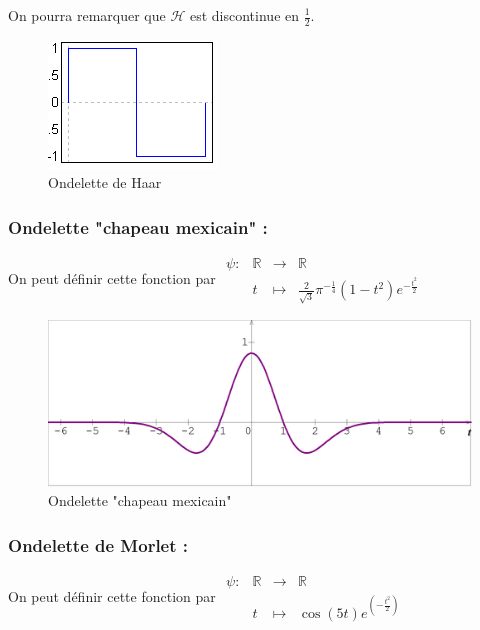 \documentclass{article}
\begin{document}
On pourra remarquer que $\mathcal{H}$ est discontinue en $\frac{1}{2}$.

\begin{figure}[!h]
\centering
\includegraphics[scale=1.1]{images/haar.png}
\caption{Ondelette de Haar}
\label{haar}
\end{figure}

\subsubsection{Ondelette "chapeau mexicain" :}

On peut définir cette fonction par $\begin{array}{lrcl}
\psi : & \mathbb{R} & \longrightarrow & \mathbb{R} \\
    & t & \longmapsto & \frac{2}{\sqrt{3}}\pi^{-\frac{1}{4}}(1-t^2)e^{-\frac{t^2}{2}} \end{array}$
    
\begin{figure}[!h]
\centering
\includegraphics[scale=0.2]{images/chapeau_mexicain.png}
\caption{Ondelette "chapeau mexicain"}
\label{chapmex}
\end{figure}
    
\subsubsection{Ondelette de Morlet :}

On peut définir cette fonction par $\begin{array}{lrcl}
\psi : & \mathbb{R} & \longrightarrow & \mathbb{R} \\
    & t & \longmapsto & \cos(5t)e^{(-\frac{t^2}{2})} \end{array}$
    
\end{document}
